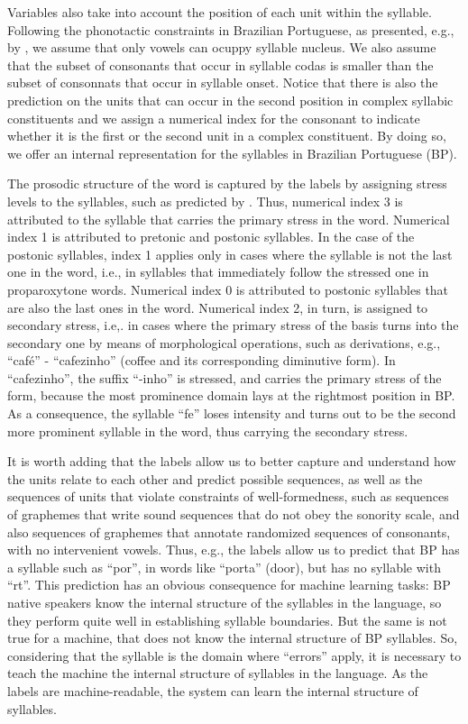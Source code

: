 Variables also take into account the position of each unit within the syllable. Following the phonotactic constraints in Brazilian Portuguese, as presented, e.g., by \citet{Collischonn1996}, we assume that only vowels can ocuppy syllable nucleus. We also assume that the subset of consonants that occur in syllable codas is smaller than the subset of consonnats that occur in syllable onset. Notice that there is also the prediction on the units that can occur in the second position in complex syllabic constituents and we assign a numerical index for the consonant to indicate whether it is the first or the second unit in a complex constituent. By doing so, we offer an internal representation for the syllables in Brazilian Portuguese (BP).

The prosodic structure of the word is captured by the labels by assigning stress levels to the syllables, such as predicted by \citet{Camara1970}. Thus, numerical index 3 is attributed to the syllable that carries the primary stress in the word. Numerical index 1 is attributed to pretonic and postonic syllables. In the case of the postonic syllables, index 1 applies only in cases where the syllable is not the last one in the word, i.e., in syllables that immediately follow the stressed one in proparoxytone words. Numerical index 0 is attributed to postonic syllables that are also the last ones in the word. Numerical index 2, in turn, is assigned to secondary stress, i.e,. in cases where the primary stress of the basis turns into the secondary one by means of morphological operations, such as derivations, e.g., ``café'' - ``cafezinho'' (coffee and its corresponding diminutive form). In ``cafezinho'', the suffix ``-inho'' is stressed, and carries the primary stress of the form, because the most prominence domain lays at the rightmost position in BP. As a consequence, the syllable ``fe'' loses intensity and turns out to be the second more prominent syllable in the word, thus carrying the secondary stress.

It is worth adding that the labels allow us to better capture and understand how the units relate to each other and predict possible sequences, as well as the sequences of units that violate constraints of well-formedness, such as sequences of graphemes that write sound sequences that do not obey the sonority scale, and also sequences of graphemes that annotate randomized sequences of consonants, with no intervenient vowels. Thus, e.g., the labels allow us to predict that BP has a syllable such as ``por'', in words like ``porta'' (door), but has no syllable with ``rt''. This prediction has an obvious consequence for machine learning tasks: BP native speakers know the internal structure of the syllables in the language, so they perform quite well in establishing syllable boundaries. But the same is not true for a machine, that does not know the internal structure of BP syllables. So, considering that the syllable is the domain where ``errors'' apply, it is necessary to teach the machine the internal structure of syllables in the language. As the labels are machine-readable, the system can learn the internal structure of syllables.

